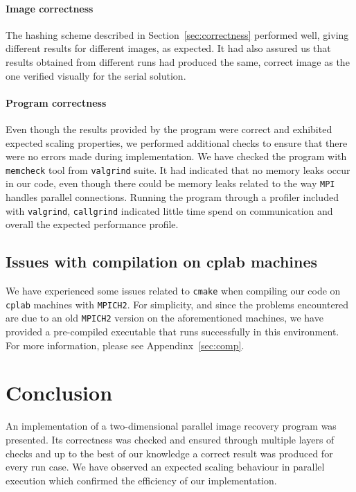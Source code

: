 \documentclass[11pt,a4paper]{article}
\begin{document}
\paragraph{Image correctness}
The hashing scheme described in Section~\ref{sec:correctness} performed well, giving different results for different images, as expected.
It had also assured us that results obtained from different runs had produced the same, correct image as the one verified visually for the serial solution.

\paragraph{Program correctness}
Even though the results provided by the program were correct and exhibited expected scaling properties, we performed additional checks to ensure that there were no errors made during implementation.
We have checked the program with \texttt{memcheck} tool from \texttt{valgrind} suite.
It had indicated that no memory leaks occur in our code, even though there could be memory leaks related to the way \texttt{MPI} handles parallel connections.
Running the program through a profiler included with \texttt{valgrind}, \texttt{callgrind} indicated little time spend on communication and overall the expected performance profile.

\subsection{Issues with compilation on cplab machines}
We have experienced some issues related to \texttt{cmake} when compiling our code on \texttt{cplab} machines with \texttt{MPICH2}.
For simplicity, and since the problems encountered are due to an old \texttt{MPICH2} version on the aforementioned machines, we have provided a pre-compiled executable that runs successfully in this environment.
For more information, please see Appendinx~\ref{sec:comp}.

\section{Conclusion}
An implementation of a two-dimensional parallel image recovery program was presented.
Its correctness was checked and ensured through multiple layers of checks and up to the best of our knowledge a correct result was produced for every run case.
We have observed an expected scaling behaviour in parallel execution which confirmed the efficiency of our implementation.
\end{document}
